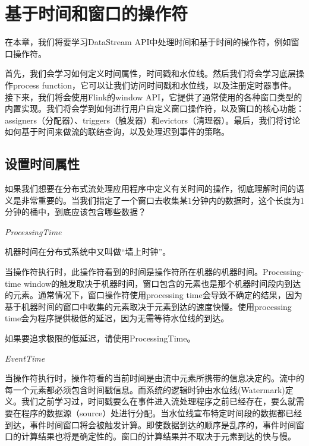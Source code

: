 \documentclass[cn,11pt,chinese]{elegantbook}
\renewenvironment{quote}{\begin{customblockquote}\list{}{\rightmargin=0em\leftmargin=0em}%
\item\relax\color{blockquote-text}\ignorespaces}{\unskip\unskip\endlist\end{customblockquote}}
\begin{document}
\hypertarget{ux57faux4e8eux65f6ux95f4ux548cux7a97ux53e3ux7684ux64cdux4f5cux7b26}{%
\chapter{基于时间和窗口的操作符}\label{ux57faux4e8eux65f6ux95f4ux548cux7a97ux53e3ux7684ux64cdux4f5cux7b26}}

在本章，我们将要学习DataStream
API中处理时间和基于时间的操作符，例如窗口操作符。

首先，我们会学习如何定义时间属性，时间戳和水位线。然后我们将会学习底层操作process
function，它可以让我们访问时间戳和水位线，以及注册定时器事件。接下来，我们将会使用Flink的window
API，它提供了通常使用的各种窗口类型的内置实现。我们将会学到如何进行用户自定义窗口操作符，以及窗口的核心功能：assigners（分配器）、triggers（触发器）和evictors（清理器）。最后，我们将讨论如何基于时间来做流的联结查询，以及处理迟到事件的策略。

\hypertarget{ux8bbeux7f6eux65f6ux95f4ux5c5eux6027}{%
\section{设置时间属性}\label{ux8bbeux7f6eux65f6ux95f4ux5c5eux6027}}

如果我们想要在分布式流处理应用程序中定义有关时间的操作，彻底理解时间的语义是非常重要的。当我们指定了一个窗口去收集某1分钟内的数据时，这个长度为1分钟的桶中，到底应该包含哪些数据？

\emph{ProcessingTime}

\begin{quote}
机器时间在分布式系统中又叫做``墙上时钟''。
\end{quote}

当操作符执行时，此操作符看到的时间是操作符所在机器的机器时间。Processing-time
window的触发取决于机器时间，窗口包含的元素也是那个机器时间段内到达的元素。通常情况下，窗口操作符使用processing
time会导致不确定的结果，因为基于机器时间的窗口中收集的元素取决于元素到达的速度快慢。使用processing
time会为程序提供极低的延迟，因为无需等待水位线的到达。

\begin{quote}
如果要追求极限的低延迟，请使用ProcessingTime。
\end{quote}

\emph{EventTime}

当操作符执行时，操作符看的当前时间是由流中元素所携带的信息决定的。流中的每一个元素都必须包含时间戳信息。而系统的逻辑时钟由水位线(Watermark)定义。我们之前学习过，时间戳要么在事件进入流处理程序之前已经存在，要么就需要在程序的数据源（source）处进行分配。当水位线宣布特定时间段的数据都已经到达，事件时间窗口将会被触发计算。即使数据到达的顺序是乱序的，事件时间窗口的计算结果也将是确定性的。窗口的计算结果并不取决于元素到达的快与慢。
\end{document}

